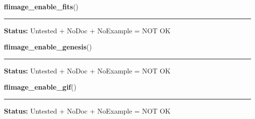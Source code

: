     \label{xformslib:library:flimage_enable_fits}

    \vspace{0.5ex}

\hspace{.8\funcindent}\begin{boxedminipage}{\funcwidth}

    \raggedright \textbf{flimage\_enable\_fits}()

    \vspace{-1.5ex}

    \rule{\textwidth}{0.5\fboxrule}
\setlength{\parskip}{2ex}
\setlength{\parskip}{1ex}
\textbf{Status:} Untested + NoDoc + NoExample = NOT OK



    \end{boxedminipage}

    \label{xformslib:library:flimage_enable_genesis}

    \vspace{0.5ex}

\hspace{.8\funcindent}\begin{boxedminipage}{\funcwidth}

    \raggedright \textbf{flimage\_enable\_genesis}()

    \vspace{-1.5ex}

    \rule{\textwidth}{0.5\fboxrule}
\setlength{\parskip}{2ex}
\setlength{\parskip}{1ex}
\textbf{Status:} Untested + NoDoc + NoExample = NOT OK



    \end{boxedminipage}

    \label{xformslib:library:flimage_enable_gif}

    \vspace{0.5ex}

\hspace{.8\funcindent}\begin{boxedminipage}{\funcwidth}

    \raggedright \textbf{flimage\_enable\_gif}()

    \vspace{-1.5ex}

    \rule{\textwidth}{0.5\fboxrule}
\setlength{\parskip}{2ex}
\setlength{\parskip}{1ex}
\textbf{Status:} Untested + NoDoc + NoExample = NOT OK



    \end{boxedminipage}

